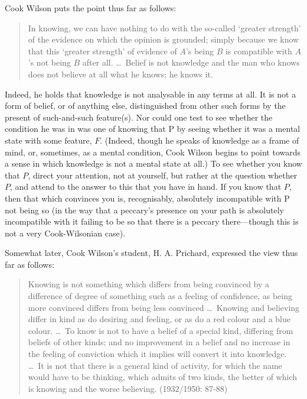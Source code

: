 Cook Wilson puts the point thus far as follows:
\begin{quote}
	In knowing, we can have nothing to do with the so-called `greater strength' of the evidence on which the opinion is grounded; simply because we know that this `greater strength' of evidence of \( A \)’s being \( B \) is compatible with \( A \)’s not being \( B \) after all. \ldots\ Belief is not knowledge and the man who knows does not believe at all what he knows; he knows it. \cite[100]{Cook-Wilson:1926sf}
\end{quote}

Indeed, he holds that knowledge is not analysable in any terms at all. It is not a form of belief, or of anything else, distinguished from other such forms by the present of such-and-such feature(s). Nor could one test to see whether the condition he was in was one of knowing that P by seeing whether it was a mental state with some feature, \( F \). (Indeed, though he speaks of knowledge as a frame of mind, or, sometimes, as a mental condition, Cook Wilson begins to point towards a sense in which knowledge is not a mental state at all.) To see whether you know that \( P \), direct your attention, not at yourself, but rather at the question whether \( P \), and attend to the answer to this that you have in hand. If you know that \( P \), then that which convinces you is, recognisably, absolutely incompatible with P not being so (in the way that a peccary’s presence on your path is absolutely incompatible with it failing to be so that there is a peccary there—though this is not a very Cook-Wilsonian case).

Somewhat later, Cook Wilson’s student, H. A. Prichard, expressed the view thus far as follows:
\begin{quote}
	Knowing is not something which differs from being convinced by a difference of degree of something such as a feeling of confidence, as being more convinced differs from being less convinced \ldots\ Knowing and believing differ in kind as do desiring and feeling, or as do a red colour and a blue colour. \ldots\ To know is not to have a belief of a special kind, differing from beliefs of other kinds; and no improvement in a belief and no increase in the feeling of conviction which it implies will convert it into knowledge. \ldots\ It is not that there is a general kind of activity, for which the name would have to be thinking, which admits of two kinds, the better of which is knowing and the worse believing. (1932/1950: 87-88)
\end{quote}

